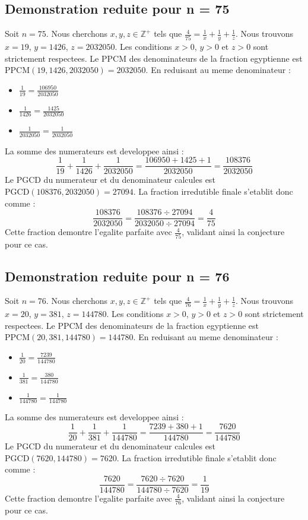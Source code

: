 \documentclass[11pt,a4paper]{article}
\begin{document}
\subsection{Demonstration reduite pour n = 75}
Soit $n = 75$. Nous cherchons $x, y, z \in \mathbb{Z}^{+}$ tels que $\frac{4}{75} = \frac{1}{x} + \frac{1}{y} + \frac{1}{z}$.
Nous trouvons $x = 19$, $y = 1426$, $z = 2032050$.
Les conditions $x > 0$, $y > 0$ et $z > 0$ sont strictement respectees.
Le PPCM des denominateurs de la fraction egyptienne est $\text{PPCM}(19, 1426, 2032050) = 2032050$.
En reduisant au meme denominateur :
\begin{itemize}
    \item $\frac{1}{19} = \frac{106950}{2032050}$
    \item $\frac{1}{1426} = \frac{1425}{2032050}$
    \item $\frac{1}{2032050} = \frac{1}{2032050}$
\end{itemize}
La somme des numerateurs est developpee ainsi :
$$ \frac{1}{19} + \frac{1}{1426} + \frac{1}{2032050} = \frac{106950 + 1425 + 1}{2032050} = \frac{108376}{2032050} $$
Le PGCD du numerateur et du denominateur calcules est $\text{PGCD}(108376, 2032050) = 27094$.
La fraction irredutible finale s'etablit donc comme :
$$ \frac{108376}{2032050} = \frac{108376 \div 27094}{2032050 \div 27094} = \frac{4}{75} $$
Cette fraction demontre l'egalite parfaite avec $\frac{4}{75}$, validant ainsi la conjecture pour ce cas.

\subsection{Demonstration reduite pour n = 76}
Soit $n = 76$. Nous cherchons $x, y, z \in \mathbb{Z}^{+}$ tels que $\frac{4}{76} = \frac{1}{x} + \frac{1}{y} + \frac{1}{z}$.
Nous trouvons $x = 20$, $y = 381$, $z = 144780$.
Les conditions $x > 0$, $y > 0$ et $z > 0$ sont strictement respectees.
Le PPCM des denominateurs de la fraction egyptienne est $\text{PPCM}(20, 381, 144780) = 144780$.
En reduisant au meme denominateur :
\begin{itemize}
    \item $\frac{1}{20} = \frac{7239}{144780}$
    \item $\frac{1}{381} = \frac{380}{144780}$
    \item $\frac{1}{144780} = \frac{1}{144780}$
\end{itemize}
La somme des numerateurs est developpee ainsi :
$$ \frac{1}{20} + \frac{1}{381} + \frac{1}{144780} = \frac{7239 + 380 + 1}{144780} = \frac{7620}{144780} $$
Le PGCD du numerateur et du denominateur calcules est $\text{PGCD}(7620, 144780) = 7620$.
La fraction irredutible finale s'etablit donc comme :
$$ \frac{7620}{144780} = \frac{7620 \div 7620}{144780 \div 7620} = \frac{1}{19} $$
Cette fraction demontre l'egalite parfaite avec $\frac{4}{76}$, validant ainsi la conjecture pour ce cas.
\end{document}
